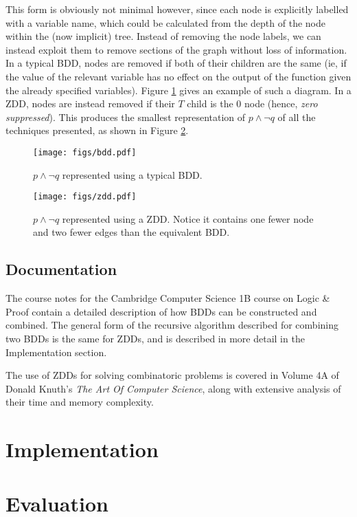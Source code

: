 \documentclass[12pt,a4paper,twoside,openright]{report}
\begin{document}
This form is obviously not minimal however, since each node is explicitly labelled with a variable name, which could be calculated from the depth of the node within the (now implicit) tree. Instead of removing the node labels, we can instead exploit them to remove sections of the graph without loss of information. In a typical BDD, nodes are removed if both of their children are the same (ie, if the value of the relevant variable has no effect on the output of the function given the already specified variables). Figure \ref{bdd} gives an example of such a diagram. In a ZDD, nodes are instead removed if their $T$ child is the $0$ node (hence, \emph{zero suppressed}). This produces the smallest representation of $p\wedge\neg q$ of all the techniques presented, as shown in Figure \ref{zdd}.

\begin{figure}[tbh]
\centerline{\texttt{[image: figs/bdd.pdf]}}
\caption{$p\wedge\neg q$ represented using a typical BDD.}
\label{bdd}
\end{figure}

\begin{figure}[tbh]
\centerline{\texttt{[image: figs/zdd.pdf]}}
\caption{$p\wedge\neg q$ represented using a ZDD. Notice it contains one fewer node and two fewer edges than the equivalent BDD.}
\label{zdd}
\end{figure}

\section{Documentation}
The course notes for the Cambridge Computer Science 1B course on Logic \& Proof contain a detailed description of how BDDs can be constructed and combined. The general form of the recursive algorithm described for combining two BDDs is the same for ZDDs, and is described in more detail in the Implementation section.

The use of ZDDs for solving combinatoric problems is covered in Volume 4A of Donald Knuth's \emph{The Art Of Computer Science}, along with extensive analysis of their time and memory complexity.

\chapter{Implementation}

\chapter{Evaluation}
\end{document}
